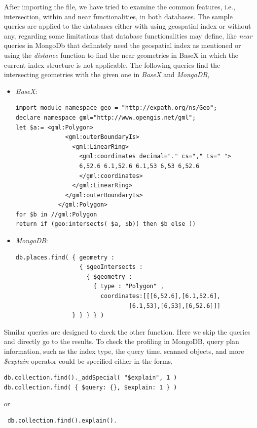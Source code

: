\documentclass[a4paper,12pt]{article}
\begin{document}
After importing the file, we have tried to examine the common features, i.e., intersection, within and near functionalities, in both databases.
The sample queries are applied to the databases either with using geospatial index or without any, regarding some limitations that database functionalities may define, like \textit{near} queries in MongoDb that definately need the geospatial index as mentioned or using the \textit{distance} function to find the near geometries in BaseX in which the current index structure is not applicable.
The following queries find the intersecting geometries with the given one in \textit{BaseX} and \textit{MongoDB},

\begin{itemize}
\item \textit{BaseX}:
\begin{verbatim}
import module namespace geo = "http://expath.org/ns/Geo";
declare namespace gml="http://www.opengis.net/gml";
let $a:= <gml:Polygon>
              <gml:outerBoundaryIs>
                <gml:LinearRing>
                  <gml:coordinates decimal="." cs="," ts=" ">
                  6,52.6 6.1,52.6 6.1,53 6,53 6,52.6
                  </gml:coordinates>
                </gml:LinearRing>
              </gml:outerBoundaryIs>
            </gml:Polygon>
for $b in //gml:Polygon 
return if (geo:intersects( $a, $b)) then $b else ()
\end{verbatim}
\item \textit{MongoDB}: 
\begin{verbatim}
db.places.find( { geometry :
                  { $geoIntersects :
                    { $geometry :
                      { type : "Polygon" ,
                        coordinates:[[[6,52.6],[6.1,52.6],
                        	    [6.1,53],[6,53],[6,52.6]]]
                } } } } )
\end{verbatim}
\end{itemize}
Similar queries are designed to check the other function. Here we skip the queries and directly go to the results. To check the profiling in MongoDB, query plan information, such as the index type, the query time, scanned objects, and more \textit{\$explain} operator could be specified either in the forms,
\begin{verbatim}
db.collection.find()._addSpecial( "$explain", 1 )
db.collection.find( { $query: {}, $explain: 1 } )
\end{verbatim}
 or 
 \begin{verbatim}
 db.collection.find().explain().
 \end{verbatim}
 
\end{document}
